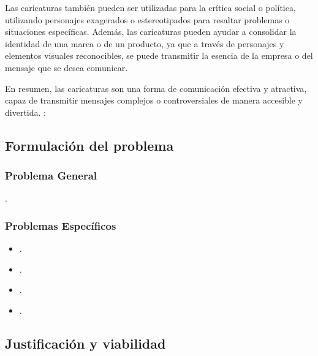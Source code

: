\documentclass[12pt,a4paper]{article}
\begin{document}
Las caricaturas también pueden ser utilizadas para la crítica social o política, utilizando personajes exagerados o estereotipados para resaltar problemas o situaciones específicas. Además, las caricaturas pueden ayudar a consolidar la identidad de una marca o de un producto, ya que a través de personajes y elementos visuales reconocibles, se puede transmitir la esencia de la empresa o del mensaje que se desea comunicar.

En resumen, las caricaturas son una forma de comunicación efectiva y atractiva, capaz de transmitir mensajes complejos o controversiales de manera accesible y divertida. \cite{grose_principios_2011}:


\subsection{Formulación del problema}
\subsubsection{Problema General}
\problema.
\subsubsection{Problemas Específicos}
\begin{itemize}
	\item \problemae.
	\item \problemaee.
	\item \problemaeee.
	\item \problemaeeee.
\end{itemize}

\subsection{Justificación y viabilidad}
\end{document}
